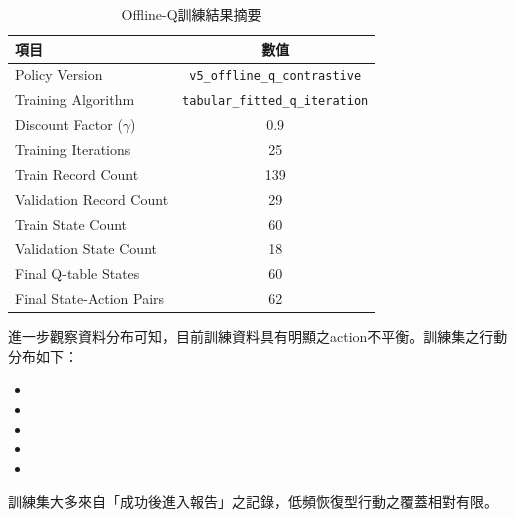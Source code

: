 \begin{ZhChapter}
\begin{table}[H]
\centering
\caption{Offline-Q訓練結果摘要}
\label{tab:q_training_summary}
\renewcommand{\arraystretch}{1.3}
\begin{tabular}{lc}
\toprule
\textbf{項目} & \textbf{數值} \\
\midrule
Policy Version & \texttt{v5\_offline\_q\_contrastive} \\
Training Algorithm & \texttt{tabular\_fitted\_q\_iteration} \\
Discount Factor ($\gamma$) & 0.9 \\
Training Iterations & 25 \\
Train Record Count & 139 \\
Validation Record Count & 29 \\
Train State Count & 60 \\
Validation State Count & 18 \\
Final Q-table States & 60 \\
Final State-Action Pairs & 62 \\
\bottomrule
\end{tabular}
\end{table}

\text 進一步觀察資料分布可知，目前訓練資料具有明顯之action不平衡。訓練集之行動分布如下：
\begin{itemize}
    \item {}
    \item {}
    \item {}
    \item {}
    \item {}
\end{itemize}
\text 訓練集大多來自「成功後進入報告」之記錄，低頻恢復型行動之覆蓋相對有限。


\end{ZhChapter}
